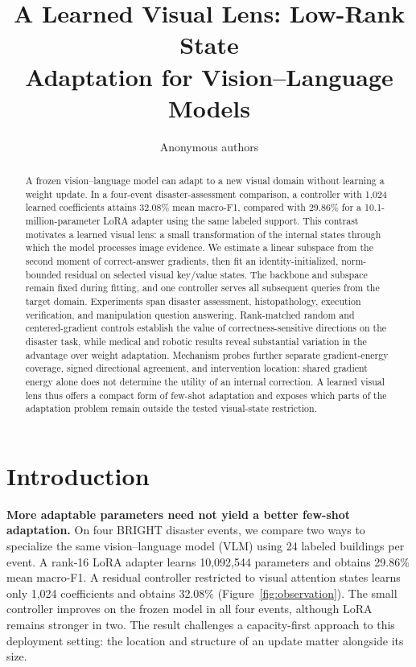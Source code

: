 \documentclass{article}
\title{A Learned Visual Lens: Low-Rank State\\ Adaptation for Vision--Language Models}
\author{Anonymous authors}
\begin{document}
\maketitle

\begin{abstract}
A frozen vision--language model can adapt to a new visual domain without learning a weight update. In a four-event disaster-assessment comparison, a controller with 1,024 learned coefficients attains 32.08\% mean macro-F1, compared with 29.86\% for a 10.1-million-parameter LoRA adapter using the same labeled support. This contrast motivates a learned visual lens: a small transformation of the internal states through which the model processes image evidence. We estimate a linear subspace from the second moment of correct-answer gradients, then fit an identity-initialized, norm-bounded residual on selected visual key/value states. The backbone and subspace remain fixed during fitting, and one controller serves all subsequent queries from the target domain. Experiments span disaster assessment, histopathology, execution verification, and manipulation question answering. Rank-matched random and centered-gradient controls establish the value of correctness-sensitive directions on the disaster task, while medical and robotic results reveal substantial variation in the advantage over weight adaptation. Mechanism probes further separate gradient-energy coverage, signed directional agreement, and intervention location: shared gradient energy alone does not determine the utility of an internal correction. A learned visual lens thus offers a compact form of few-shot adaptation and exposes which parts of the adaptation problem remain outside the tested visual-state restriction.
\end{abstract}



\section{Introduction}
\label{sec:intro}
\textbf{More adaptable parameters need not yield a better few-shot adaptation.} On four BRIGHT disaster events, we compare two ways to specialize the same vision--language model (VLM) using 24 labeled buildings per event. A rank-16 LoRA adapter learns 10,092,544 parameters and obtains 29.86\% mean macro-F1. A residual controller restricted to visual attention states learns only 1,024 coefficients and obtains 32.08\% (Figure~\ref{fig:observation}). The small controller improves on the frozen model in all four events, although LoRA remains stronger in two. The result challenges a capacity-first approach to this deployment setting: the location and structure of an update matter alongside its size.
\end{document}
